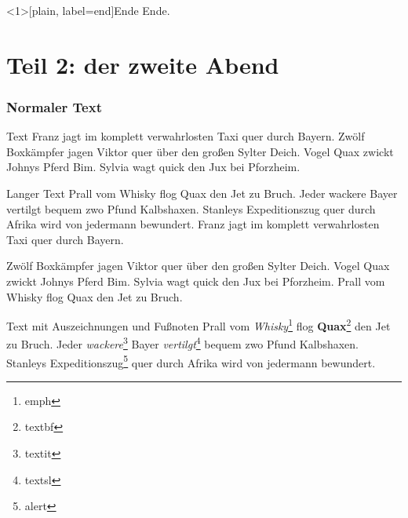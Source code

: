 	\begin{frame}[plain, label=end]{Ende}
		\Huge{Ende.}
	\end{frame}









	\part{Teil 2: der zweite Abend}

	\frame{\partpage}

	\section{Normaler Text}

	\begin{frame}{Text}
		Franz jagt im komplett verwahrlosten Taxi quer durch Bayern.
		Zwölf Boxkämpfer jagen Viktor quer über den großen Sylter Deich.
		Vogel Quax zwickt Johnys Pferd Bim.
		Sylvia wagt quick den Jux bei Pforzheim.
	\end{frame}


	\begin{frame}{Langer Text}
		Prall vom Whisky flog Quax den Jet zu Bruch.
		Jeder wackere Bayer vertilgt bequem zwo Pfund Kalbshaxen.
		Stanleys Expeditionszug quer durch Afrika wird von jedermann bewundert.
		Franz jagt im komplett verwahrlosten Taxi quer durch Bayern.

		Zwölf Boxkämpfer jagen Viktor quer über den großen Sylter Deich.
		Vogel Quax zwickt Johnys Pferd Bim.
		Sylvia wagt quick den Jux bei Pforzheim.
		Prall vom Whisky flog Quax den Jet zu Bruch.
	\end{frame}


	\begin{frame}{Text mit Auszeichnungen und Fußnoten}
		Prall vom \emph{Whisky}\footnote{emph} flog \textbf{Quax}\footnote{textbf} den Jet zu Bruch.
		Jeder \textit{wackere}\footnote{textit} Bayer \textsl{vertilgt}\footnote{textsl} bequem zwo Pfund Kalbshaxen.
		Stanleys \alert{Expeditionszug}\footnote{alert} quer durch Afrika wird von jedermann bewundert.
	\end{frame}


